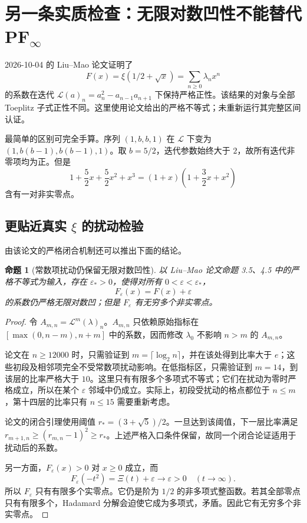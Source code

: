 \documentclass[UTF8,fontset=none,11pt,a4paper]{ctexart}
\newtheorem{prop}{命题}[section]
\begin{document}
\section{另一条实质检查：无限对数凹性不能替代 PF$_\infty$}
2026-10-04 的 Liu--Mao 论文证明了
\[
 F(x)=\xi(1/2+\sqrt x)=\sum_{n\ge0}\lambda_nx^n
\]
的系数在迭代 $\mathcal L(a)_n=a_n^2-a_{n-1}a_{n+1}$ 下保持严格正性。该结果的对象与全部 Toeplitz 子式正性不同。这里使用论文给出的严格不等式；未重新运行其完整区间认证。

最简单的区别可完全手算。序列 $(1,b,b,1)$ 在 $\mathcal L$ 下变为 $(1,b(b-1),b(b-1),1)$。取 $b=5/2$，迭代参数始终大于 $2$，故所有迭代非零项均为正。但是
\[
 1+\frac52x+\frac52x^2+x^3
 =(1+x)\left(1+\frac32x+x^2\right)
\]
含有一对非实零点。

\subsection*{更贴近真实 $\xi$ 的扰动检验}
由该论文的严格闭合机制还可以推出下面的结论。

\begin{prop}[常数项扰动仍保留无限对数凹性]
以 Liu--Mao 论文命题 3.5、4.5 中的严格不等式为输入，存在 $\varepsilon_*>0$，使得对所有 $0<\varepsilon<\varepsilon_*$，
\[
 F_\varepsilon(x)=F(x)+\varepsilon
\]
的系数仍严格无限对数凹；但是 $F_\varepsilon$ 有无穷多个非实零点。
\end{prop}
\begin{proof}
令 $A_{m,n}=\mathcal L^m(\lambda)_n$。$A_{m,n}$ 只依赖原始指标在 $[\max(0,n-m),n+m]$ 中的系数，因而修改 $\lambda_0$ 不影响 $n>m$ 的 $A_{m,n}$。

论文在 $n\ge12000$ 时，只需验证到 $m=\lceil\log_2n\rceil$，并在该处得到比率大于 $e$；这些初段及相邻项完全不受常数项扰动影响。在低指标区，只需验证到 $m=14$，到该层的比率严格大于 $10$。这里只有有限多个多项式不等式；它们在扰动为零时严格成立，所以在某个 $\varepsilon$ 邻域中仍成立。实际上，初段受扰动的格点都位于 $n\le m$，第十四层的比率只有 $n\le15$ 需要重新考虑。

论文的闭合引理使用阈值 $r_*=(3+\sqrt5)/2$。一旦达到该阈值，下一层比率满足 $r_{m+1,n}\ge(r_{m,n}-1)^2\ge r_*$。上述严格入口条件保留，故同一个闭合论证适用于扰动后的系数。

另一方面，$F_\varepsilon(x)>0$ 对 $x\ge0$ 成立，而
\[
 F_\varepsilon(-t^2)=\Xi(t)+\varepsilon\longrightarrow\varepsilon>0
 \quad(t\to\infty).
\]
所以 $F_\varepsilon$ 只有有限多个实零点。它仍是阶为 $1/2$ 的非多项式整函数。若其全部零点只有有限多个，Hadamard 分解会迫使它成为多项式，矛盾。因此它有无穷多个非实零点。
\end{proof}
\end{document}
